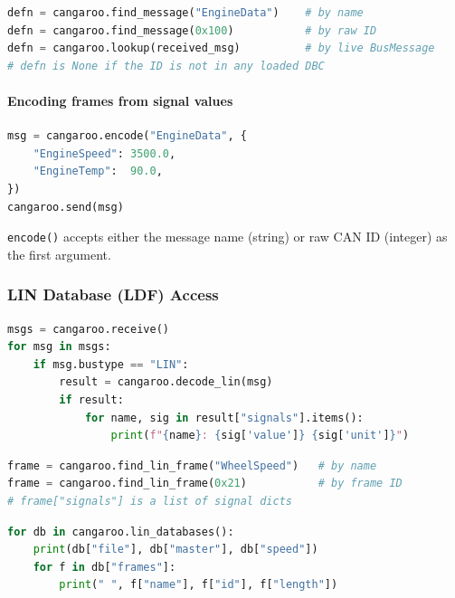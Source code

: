 \documentclass[a4paper,11pt]{article}
\begin{document}
\begin{lstlisting}[language=Python]
defn = cangaroo.find_message("EngineData")    # by name
defn = cangaroo.find_message(0x100)           # by raw ID
defn = cangaroo.lookup(received_msg)          # by live BusMessage
# defn is None if the ID is not in any loaded DBC
\end{lstlisting}

\paragraph{Encoding frames from signal values}

\begin{lstlisting}[language=Python, caption={Build and send a frame by signal name}]
msg = cangaroo.encode("EngineData", {
    "EngineSpeed": 3500.0,
    "EngineTemp":  90.0,
})
cangaroo.send(msg)
\end{lstlisting}

\texttt{encode()} accepts either the message name (string) or raw CAN ID (integer)
as the first argument.

\subsubsection{LIN Database (LDF) Access}

\begin{lstlisting}[language=Python, caption={Decode a received LIN frame}]
msgs = cangaroo.receive()
for msg in msgs:
    if msg.bustype == "LIN":
        result = cangaroo.decode_lin(msg)
        if result:
            for name, sig in result["signals"].items():
                print(f"{name}: {sig['value']} {sig['unit']}")
\end{lstlisting}

\begin{lstlisting}[language=Python, caption={Look up a LIN frame definition}]
frame = cangaroo.find_lin_frame("WheelSpeed")   # by name
frame = cangaroo.find_lin_frame(0x21)           # by frame ID
# frame["signals"] is a list of signal dicts
\end{lstlisting}

\begin{lstlisting}[language=Python, caption={List all loaded LDF databases}]
for db in cangaroo.lin_databases():
    print(db["file"], db["master"], db["speed"])
    for f in db["frames"]:
        print(" ", f["name"], f["id"], f["length"])
\end{lstlisting}
\end{document}
